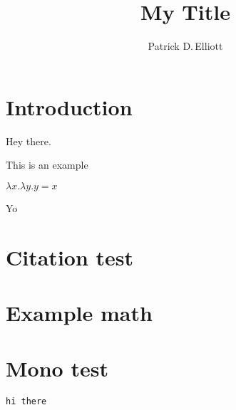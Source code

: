 \documentclass{ling-handout}
\title{My Title}
\author{Patrick D.\,Elliott}
\begin{document}
\maketitle

\begin{addmargin}[0pt]{.3\textwidth}

\section{Introduction}

\kant[1-2]



Hey there.

\syncwithnotecolumns[paragraphs]

\ex
This is an example
\xe

\ex
\(λ x . λ y . y = x\)
\xe

Yo

\section{Citation test}

\section{Example math}

\section{Mono test}

\texttt{hi there}

\printbibliography

\end{addmargin}
\end{document}

